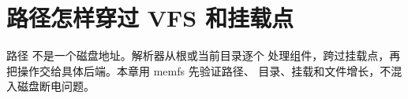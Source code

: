 \chapter{路径怎样穿过 VFS 和挂载点}

路径  不是一个磁盘地址。解析器从根或当前目录逐个
处理组件，跨过挂载点，再把操作交给具体后端。本章用 memfs 先验证路径、
目录、挂载和文件增长，不混入磁盘断电问题。



